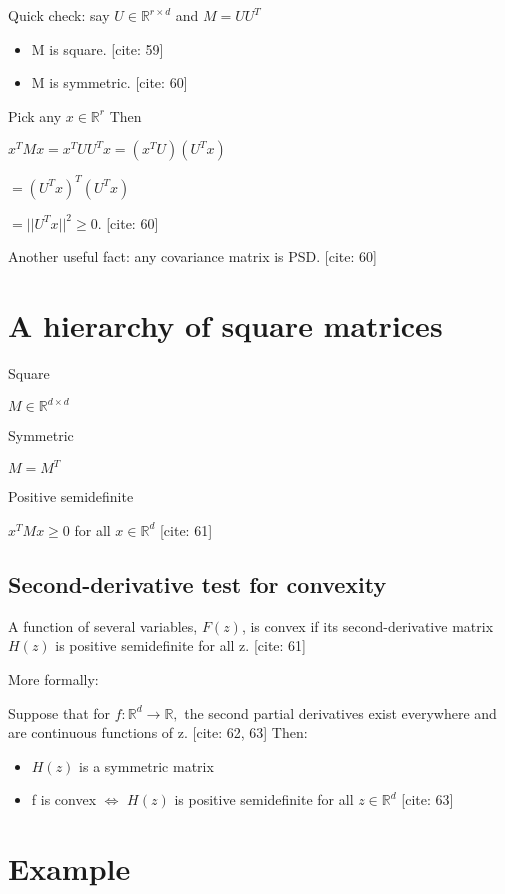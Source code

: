 \documentclass{article}
\begin{document}
Quick check: say $U\in\mathbb{R}^{r\times d}$ and $M=UU^{T}$

\begin{itemize}
    \item  M is square. [cite: 59]
    \item M is symmetric. [cite: 60]
\end{itemize}

Pick any $x\in\mathbb{R}^{r}$ Then

$x^{T}Mx=x^{T}UU^{T}x=(x^{T}U)(U^{T}x)$

$=(U^{T}x)^{T}(U^{T}x)$

$=||U^{T}x||^{2}\ge0$. [cite: 60]

Another useful fact: any covariance matrix is PSD. [cite: 60]

\section{A hierarchy of square matrices}

Square

$M\in\mathbb{R}^{d\times d}$

Symmetric

$M=M^{T}$

Positive semidefinite

$x^{T}Mx\ge0$ for all $x\in\mathbb{R}^{d}$ [cite: 61]

\subsection{Second-derivative test for convexity}

A function of several variables, $F(z)$, is convex if its second-derivative matrix $H(z)$ is positive semidefinite for all z. [cite: 61]

More formally:

Suppose that for $f:\mathbb{R}^{d}\rightarrow\mathbb{R},$ the second partial derivatives exist everywhere and are continuous functions of z. [cite: 62, 63]
Then:

\begin{itemize}
    \item $H(z)$ is a symmetric matrix
    \item f is convex $\Leftrightarrow$ $H(z)$ is positive semidefinite for all $z\in\mathbb{R}^{d}$ [cite: 63]
\end{itemize}

\section{Example}
\end{document}
